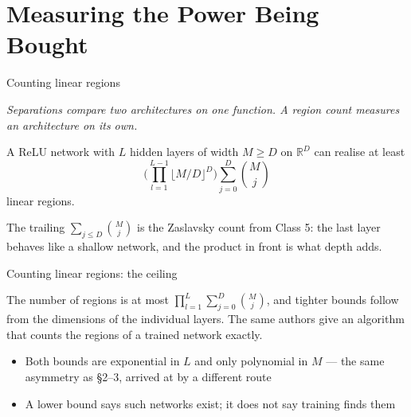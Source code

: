 \documentclass[aspectratio=169, 11pt]{beamer}
\newcommand{\bridge}[1]{%
  {\scriptsize\itshape\color{mcMuted} #1\par}\vspace{0.35em}}
\newcommand{\src}[3]{}      %
\begin{document}
\section{Measuring the Power Being Bought}

\begin{frame}{Counting linear regions}
  \src{montufar2014}{section}{3.2}
  \bridge{Separations compare two architectures on one function. A
  region count measures an architecture on its own.}
  \vspace{0.3em}
  \begin{theorem}
    {\small A ReLU network with $L$ hidden layers of width $M\geq D$ on
    $\mathbb{R}^{D}$ can realise at least
    \[
      \Big(\prod_{l=1}^{L-1}\big\lfloor M/D \big\rfloor^{D}\Big)
      \sum_{j=0}^{D}\binom{M}{j}
    \]
    linear regions.}
  \end{theorem}
  \vspace{0.3em}
  {\small The trailing $\sum_{j\leq D}\binom{M}{j}$ is the
  \alert{Zaslavsky count} from Class 5: the last layer behaves like a
  shallow network, and the product in front is what depth adds.}
\end{frame}

\begin{frame}{Counting linear regions: the ceiling}
  \src{serra2018}{section}{3.1}
  \src{serra2018}{section}{5}
  \vspace{0.3em}
  \begin{theorem}
    {\small The number of regions is at most
    $\prod_{l=1}^{L}\sum_{j=0}^{D}\binom{M}{j}$, and tighter bounds
    follow from the dimensions of the individual layers. The same
    authors give an algorithm that counts the regions of a trained
    network exactly.}
  \end{theorem}
  \vspace{0.5em}
  {\small
  \begin{itemize}\setlength{\itemsep}{4pt}
    \item Both bounds are \alert{exponential in $L$} and only
          \alert{polynomial in $M$} --- the same asymmetry as \S2--3,
          arrived at by a different route
    \item A lower bound says such networks \alert{exist}; it does not
          say training finds them
  \end{itemize}}
\end{frame}
\end{document}
